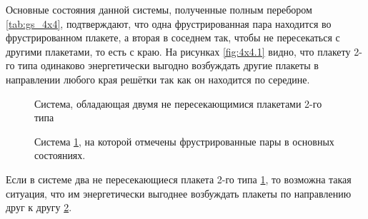 \documentclass[utf8, babel, sor, jor, amsmath, amssymb, reprint]{elsarticle} %
\begin{document}
Основные состояния данной системы, полученные полным перебором \ref{tab:gs_4x4}, подтверждают, что одна фрустрированная пара находится во фрустрированном плакете, а вторая в соседнем так, чтобы не пересекаться с другими плакетами, то есть с краю. На рисунках \ref{fig:4x4.1} видно, что плакету 2-го типа одинаково энергетически выгодно возбуждать другие плакеты в направлении любого края решётки так как он находится по середине.

\begin{figure}[H]
	\centering
	\caption{Система, обладающая двумя не пересекающимися плакетами 2-го типа}
	\label{fig:4x7}
\end{figure}
\begin{figure}[H]
	\centering
	\caption{Система \ref{fig:4x7}, на которой отмечены фрустрированные пары  в основных состояниях.}
	\label{fig:4x7F}
\end{figure}

Если в системе два не пересекающиеся плакета 2-го типа \ref{fig:4x7}, то возможна такая ситуация, что им энергетически выгоднее возбуждать плакеты по направлению друг к другу \ref{fig:4x7F}.
\end{document}
